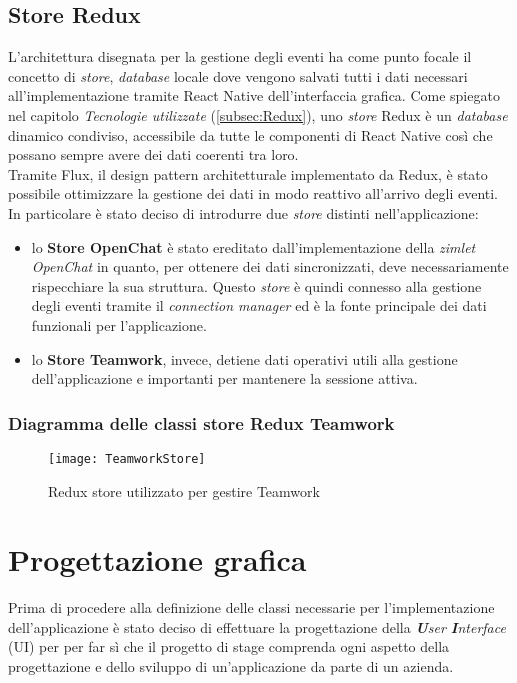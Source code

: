 \subsection{Store Redux}
L'architettura disegnata per la gestione degli eventi ha come punto focale il concetto di \emph{store}, \emph{database} locale dove vengono salvati tutti i dati necessari all'implementazione tramite React Native dell'interfaccia grafica. Come spiegato nel capitolo \emph{Tecnologie utilizzate} (\ref{subsec:Redux}), uno \emph{store} Redux è un \emph{database} dinamico condiviso, accessibile da tutte le componenti di React Native così che possano sempre avere dei dati coerenti tra loro. \\
Tramite Flux, il design pattern architetturale implementato da Redux, è stato possibile ottimizzare la gestione dei dati in modo reattivo all'arrivo degli eventi. \\
In particolare è stato deciso di introdurre due \emph{store} distinti nell'applicazione:
\begin{itemize}
	\item lo \textbf{Store OpenChat }è stato ereditato dall'implementazione della \emph{zimlet OpenChat} in quanto, per ottenere dei dati sincronizzati, deve necessariamente rispecchiare la sua struttura. Questo \emph{store} è quindi connesso alla gestione degli eventi tramite il \emph{connection manager} ed è la fonte principale dei dati funzionali per l'applicazione.
	\item lo \textbf{Store Teamwork}, invece, detiene dati operativi utili alla gestione dell'applicazione e importanti per mantenere la sessione attiva.
\end{itemize} 
\subsubsection{Diagramma delle classi store Redux Teamwork}
\begin{figure}[H] 
	\centering
	\texttt{[image: TeamworkStore]}
	\caption{Redux store utilizzato per gestire Teamwork}
\end{figure}

\section{Progettazione grafica}
Prima di procedere alla definizione delle classi necessarie per l'implementazione 
dell'applicazione è stato deciso di effettuare la progettazione della \emph{\textbf{U}ser \textbf{I}nterface} (\acrshort{UI}) per per far sì che il progetto
di stage comprenda ogni aspetto della progettazione e dello sviluppo di
un'applicazione da parte di un azienda.

